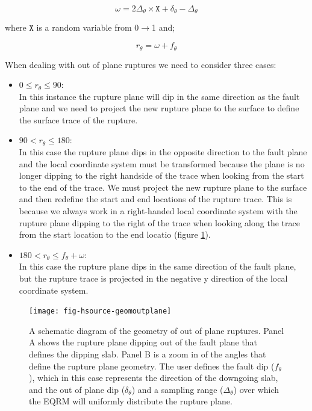 \begin{equation}
\omega = 2\Delta_\theta  \times \mathtt{X} + \delta_\theta - \Delta_\theta
\end{equation}

where $\mathtt{X}$ is a random variable from 0$\rightarrow$1 and;

\begin{equation}
r_\theta = \omega + f_\theta
\end{equation}

When dealing with out of plane ruptures we need to consider three cases:
\begin{itemize} 
\item $0 \leq r_\theta \leq 90:$ \\ In this instance the rupture plane will dip in the same direction as the fault plane and we need to project the new rupture plane to the surface to define the surface trace of the rupture.
\item $90 <  r_\theta \leq 180:$ \\ In this case the rupture plane dips in the opposite direction to the fault plane and the local coordinate system must be transformed because the plane is no longer dipping to the right handside of the trace when looking from the start to the end of the trace. We must project the new rupture plane to the surface and then redefine the start and end locations of the rupture trace. This is because we always work in a right-handed local coordinate system with the rupture plane dipping to the right of the trace when looking along the trace from the start location to the end locatio (figure \ref{fig:intraslabGeom}).  
\item $180 < r_\theta \leq f_\theta + \omega :$ \\ In this case the rupture plane dips in the same direction of the fault plane, but the rupture trace is projected in the negative y direction of the local coordinate system. 
\end{itemize}
\begin{figure}[htp]
\centerline{\texttt{[image: fig-hsource-geomoutplane]}}
\caption{A schematic diagram of the geometry of out of plane ruptures. Panel A shows the rupture plane dipping out of the fault plane that defines the dipping slab. Panel B is a zoom in of the angles that define the rupture plane geometry. The user defines the fault dip ($f_\theta$), which in this case represents the direction of the downgoing slab, and the out of plane dip ($\delta_\theta$) and a sampling range ($\Delta_\theta$) over which the EQRM will uniformly distribute the rupture plane. }
\label{fig:intraslabGeom}
\end{figure}

